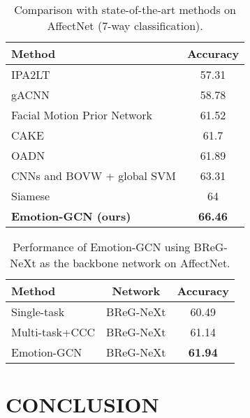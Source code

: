 \documentclass[a4paper, 10pt, conference]{ieeeconf}      \usepackage{FG2021}
\begin{document}
\begin{table}[t]
  \caption{Comparison with state-of-the-art methods on AffectNet (7-way classification).}
  \label{table:results_sota}
  \begin{center}
  \begin{tabular}{lc}
    \textbf{Method} & \textbf{Accuracy} \\
    \toprule
    IPA2LT \cite{zeng2018facial}                         & 57.31 \\
    gACNN \cite{li2018occlusion}                         & 58.78 \\
    Facial Motion Prior Network \cite{chen2019facial}    & 61.52 \\
    CAKE \cite{kervadec2018cake}                         & 61.7 \\
    OADN \cite{ding2020occlusion}                        & 61.89 \\
    CNNs and BOVW + global SVM \cite{georgescu2019local} & 63.31 \\
    Siamese \cite{hayale2019facial}                      & 64 \\
    \textbf{Emotion-GCN (ours)}   & \textbf{66.46} \\
  \end{tabular}
  \end{center}
\end{table}

\begin{table}[t]
  \caption{Performance of Emotion-GCN using BReG-NeXt as the backbone network on AffectNet.}
  \label{table:results_breg}
  \begin{center}
  \begin{tabular}{lcc}
    \textbf{Method} & \textbf{Network} & \textbf{Accuracy} \\
    \toprule
    Single-task & BReG-NeXt                                            & 60.49\\
    Multi-task+CCC & BReG-NeXt                               & 61.14\\
    Emotion-GCN & BReG-NeXt                              & \textbf{61.94}\\
  \end{tabular}
  \end{center}
\end{table}

\section{CONCLUSION}
\label{sec:conclusion}
\end{document}

